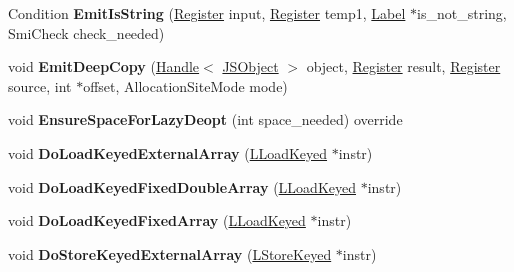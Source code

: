 \begin{DoxyCompactItemize}
\item 
Condition {\bfseries Emit\+Is\+String} (\hyperlink{structv8_1_1internal_1_1_register}{Register} input, \hyperlink{structv8_1_1internal_1_1_register}{Register} temp1, \hyperlink{classv8_1_1internal_1_1_label}{Label} $\ast$is\+\_\+not\+\_\+string, Smi\+Check check\+\_\+needed)\hypertarget{classv8_1_1internal_1_1_l_code_gen_a23c72e27a6bf50a391c940939754673d}{}\label{classv8_1_1internal_1_1_l_code_gen_a23c72e27a6bf50a391c940939754673d}

\item 
void {\bfseries Emit\+Deep\+Copy} (\hyperlink{classv8_1_1internal_1_1_handle}{Handle}$<$ \hyperlink{classv8_1_1internal_1_1_j_s_object}{J\+S\+Object} $>$ object, \hyperlink{structv8_1_1internal_1_1_register}{Register} result, \hyperlink{structv8_1_1internal_1_1_register}{Register} source, int $\ast$offset, Allocation\+Site\+Mode mode)\hypertarget{classv8_1_1internal_1_1_l_code_gen_a1a84a4d1ebc9ba8736407dd2a6d1214a}{}\label{classv8_1_1internal_1_1_l_code_gen_a1a84a4d1ebc9ba8736407dd2a6d1214a}

\item 
void {\bfseries Ensure\+Space\+For\+Lazy\+Deopt} (int space\+\_\+needed) override\hypertarget{classv8_1_1internal_1_1_l_code_gen_aef92ad7e2537ea5ecfdd73252a97eb48}{}\label{classv8_1_1internal_1_1_l_code_gen_aef92ad7e2537ea5ecfdd73252a97eb48}

\item 
void {\bfseries Do\+Load\+Keyed\+External\+Array} (\hyperlink{classv8_1_1internal_1_1_l_load_keyed}{L\+Load\+Keyed} $\ast$instr)\hypertarget{classv8_1_1internal_1_1_l_code_gen_aba1cb2ce022b8f9b1e4a86a9f57356c8}{}\label{classv8_1_1internal_1_1_l_code_gen_aba1cb2ce022b8f9b1e4a86a9f57356c8}

\item 
void {\bfseries Do\+Load\+Keyed\+Fixed\+Double\+Array} (\hyperlink{classv8_1_1internal_1_1_l_load_keyed}{L\+Load\+Keyed} $\ast$instr)\hypertarget{classv8_1_1internal_1_1_l_code_gen_aa7b2c7080c1f9724950a1a7c83e0a0ba}{}\label{classv8_1_1internal_1_1_l_code_gen_aa7b2c7080c1f9724950a1a7c83e0a0ba}

\item 
void {\bfseries Do\+Load\+Keyed\+Fixed\+Array} (\hyperlink{classv8_1_1internal_1_1_l_load_keyed}{L\+Load\+Keyed} $\ast$instr)\hypertarget{classv8_1_1internal_1_1_l_code_gen_aec64c3b23ea28f8a563d436fa0bc39f3}{}\label{classv8_1_1internal_1_1_l_code_gen_aec64c3b23ea28f8a563d436fa0bc39f3}

\item 
void {\bfseries Do\+Store\+Keyed\+External\+Array} (\hyperlink{classv8_1_1internal_1_1_l_store_keyed}{L\+Store\+Keyed} $\ast$instr)\hypertarget{classv8_1_1internal_1_1_l_code_gen_ac194b20beddd01650a1534290eb6c41f}{}\label{classv8_1_1internal_1_1_l_code_gen_ac194b20beddd01650a1534290eb6c41f}


\end{DoxyCompactItemize}
